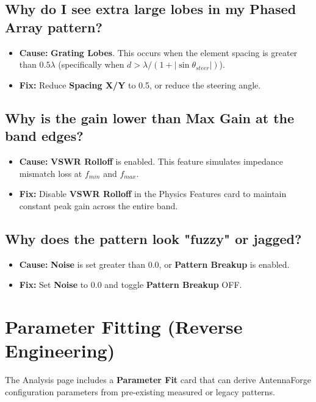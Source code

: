 \documentclass[11pt,a4paper]{article}
\begin{document}
\subsection{Why do I see extra large lobes in my Phased Array pattern?}
\begin{itemize}
    \item \textbf{Cause:} \textbf{Grating Lobes}. This occurs when the element spacing is greater than $0.5\lambda$ (specifically when $d > \lambda / (1 + |\sin\theta_{steer}|)$).
    \item \textbf{Fix:} Reduce \textbf{Spacing X/Y} to 0.5, or reduce the steering angle.
\end{itemize}

\subsection{Why is the gain lower than Max Gain at the band edges?}
\begin{itemize}
    \item \textbf{Cause:} \textbf{VSWR Rolloff} is enabled. This feature simulates impedance mismatch loss at $f_{min}$ and $f_{max}$.
    \item \textbf{Fix:} Disable \textbf{VSWR Rolloff} in the Physics Features card to maintain constant peak gain across the entire band.
\end{itemize}

\subsection{Why does the pattern look "fuzzy" or jagged?}
\begin{itemize}
    \item \textbf{Cause:} \textbf{Noise} is set greater than 0.0, or \textbf{Pattern Breakup} is enabled.
    \item \textbf{Fix:} Set \textbf{Noise} to 0.0 and toggle \textbf{Pattern Breakup} OFF.
\end{itemize}

\newpage
\section{Parameter Fitting (Reverse Engineering)}

The Analysis page includes a \textbf{Parameter Fit} card that can derive AntennaForge configuration parameters from pre-existing measured or legacy patterns.
\end{document}

